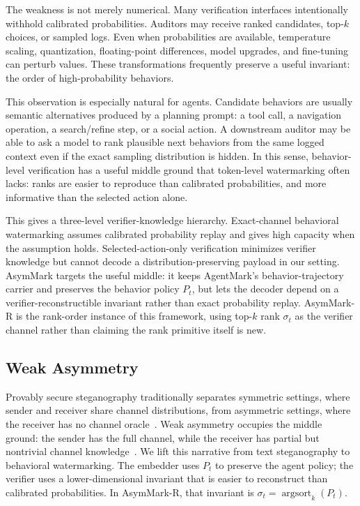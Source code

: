 \documentclass[conference,compsoc]{IEEEtran}
\newcommand{\framework}{AsymMark}
\newcommand{\ours}{AsymMark-R}
\begin{document}
The weakness is not merely numerical. Many verification interfaces intentionally withhold calibrated probabilities. Auditors may receive ranked candidates, top-$k$ choices, or sampled logs. Even when probabilities are available, temperature scaling, quantization, floating-point differences, model upgrades, and fine-tuning can perturb values. These transformations frequently preserve a useful invariant: the order of high-probability behaviors.

This observation is especially natural for agents. Candidate behaviors are usually semantic alternatives produced by a planning prompt: a tool call, a navigation operation, a search/refine step, or a social action. A downstream auditor may be able to ask a model to rank plausible next behaviors from the same logged context even if the exact sampling distribution is hidden. In this sense, behavior-level verification has a useful middle ground that token-level watermarking often lacks: ranks are easier to reproduce than calibrated probabilities, and more informative than the selected action alone.

This gives a three-level verifier-knowledge hierarchy. Exact-channel behavioral watermarking assumes calibrated probability replay and gives high capacity when the assumption holds. Selected-action-only verification minimizes verifier knowledge but cannot decode a distribution-preserving payload in our setting. \framework{} targets the useful middle: it keeps AgentMark's behavior-trajectory carrier and preserves the behavior policy $P_t$, but lets the decoder depend on a verifier-reconstructible invariant rather than exact probability replay. \ours{} is the rank-order instance of this framework, using top-$k$ rank $\sigma_t$ as the verifier channel rather than claiming the rank primitive itself is new.

\subsection{Weak Asymmetry}

Provably secure steganography traditionally separates symmetric settings, where sender and receiver share channel distributions, from asymmetric settings, where the receiver has no channel oracle~\cite{hopper2002provably,kaptchuk2021meteor}. Weak asymmetry occupies the middle ground: the sender has the full channel, while the receiver has partial but nontrivial channel knowledge~\cite{weakasym2026}. We lift this narrative from text steganography to behavioral watermarking. The embedder uses $P_t$ to preserve the agent policy; the verifier uses a lower-dimensional invariant that is easier to reconstruct than calibrated probabilities. In \ours{}, that invariant is $\sigma_t=\operatorname{argsort}_k(P_t)$.
\end{document}
